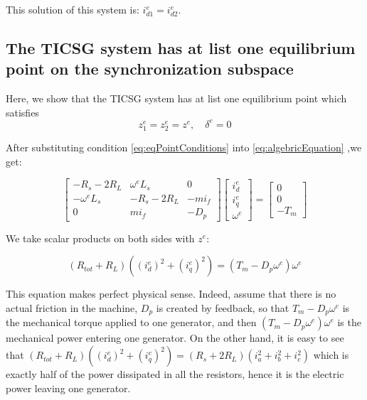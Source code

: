 \documentclass[conference]{IEEEtran}
\begin{document}
This solution of this system is: $i_{d1}^{e}=i_{d2}^{e}$.



\subsection{The TICSG system has at list one equilibrium point on the synchronization subspace}
Here, we show that the TICSG system has at list one equilibrium point which satisfies 
\begin{equation}
z_1^{e}=z_2^{e}=z^{e},\quad \delta^e=0\label{eq:eqPointConditions}
\end{equation}

After substituting condition \eqref{eq:eqPointConditions} into \eqref{eq:algebricEquation} ,we get:

\begin{equation}
\left[\begin{array}{ccc}
-R_{s}-2R_{L} & \omega^{e}L_{s} & 0\\
-\omega^{e}L_{s} & -R_{s}-2R_{L} & -mi_{f}\\
0 & mi_{f} & -D_{p}
\end{array}\right]\left[\begin{array}{c}
i_{d}^{e}\\
i_{q}^{e}\\
\omega^{e}
\end{array}\right]=\left[\begin{array}{c}
0\\
0\\
-T_{m}
\end{array}\right]\label{eq:equilbrium_algebric_eq}
\end{equation}

We take scalar products on both sides with $z^{e}$:

\[
\left(R_{tot}+R_{L}\right)\left((i_{d}^{e})^{2}+(i_{q}^{e})^{2}\right)=\left(T_{m}-D_{p}\omega^{e}\right)\omega^{e}
\]

This equation makes perfect physical sense. Indeed, assume that there
is no actual friction in the machine, $D_{p}$ is created by feedback,
so that $T_{m}-D_{p}\omega^{e}$ is the mechanical torque applied
to one generator, and then $\left(T_{m}-D_{p}\omega^{e}\right)\omega^{e}$
is the mechanical power entering one generator. On the other hand,
it is easy to see that $\left(R_{tot}+R_{L}\right)\left((i_{d}^{e})^{2}+(i_{q}^{e})^{2}\right)=\left(R_{s}+2R_{L}\right)\left(i_{a}^{2}+i_{b}^{2}+i_{c}^{2}\right)$
which is exactly half of the power dissipated in all the resistors,
hence it is the electric power leaving one generator.
\end{document}
